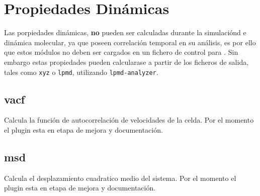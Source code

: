 \section{Propiedades Din\'amicas}
Las porpiedades din\'amicas, \textbf{no} pueden ser calculadas durante la simulaci\'ond e din\'amica molecular, ya que poseen correlaci\'on temporal en su an\'alisis, es por ello que estos m\'odulos no deben ser cargados en un fichero de control para {\lpmd}. Sin embargo estas propiedades pueden calcularase a partir de los ficheros de salida, tales como \verb|xyz| o \verb|lpmd|, utilizando \verb|lpmd-analyzer|.
\subsection{vacf}
Calcula la funci\'on de autocorrelaci\'on de velocidades de la celda. Por el momento el plugin esta en etapa de mejora y documentaci\'on.
\subsection{msd}
Calcula el desplazamiento cuadratico medio del sistema. Por el momento el plugin esta en etapa de mejora y documentaci\'on.
